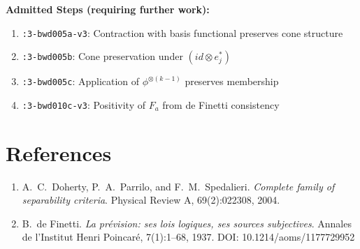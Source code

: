 \documentclass[11pt,a4paper]{article}
\theoremstyle{definition}
\theoremstyle{plain}
\begin{document}
\textbf{Admitted Steps (requiring further work):}
\begin{enumerate}
\item \texttt{:3-bwd005a-v3}: Contraction with basis functional preserves cone structure
\item \texttt{:3-bwd005b}: Cone preservation under $(id \otimes e_j^*)$
\item \texttt{:3-bwd005c}: Application of $\phi^{\otimes(k-1)}$ preserves membership
\item \texttt{:3-bwd010c-v3}: Positivity of $F_a$ from de Finetti consistency
\end{enumerate}

\section{References}

\begin{enumerate}
\item A.~C.~Doherty, P.~A.~Parrilo, and F.~M.~Spedalieri. \textit{Complete family of separability criteria}. Physical Review A, 69(2):022308, 2004.

\item B.~de Finetti. \textit{La pr\'evision: ses lois logiques, ses sources subjectives}. Annales de l'Institut Henri Poincar\'e, 7(1):1--68, 1937. DOI: 10.1214/aoms/1177729952
\end{enumerate}
\end{document}
